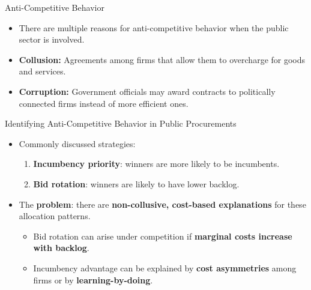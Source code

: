 \documentclass[12pt,english,xcolor=dvipsnames,aspectratio=1610]{beamer}
\begin{document}
\begin{frame}{Anti-Competitive Behavior}
  \begin{itemize}
    \item There are multiple reasons for anti-competitive behavior when the public sector is involved. \vspace{2mm}
    \item \textbf{Collusion:} Agreements among firms that allow them to overcharge for goods and services. \vspace{2mm}
    \item \textbf{Corruption:} Government officials may award contracts to politically connected firms instead of more efficient ones. \vspace{2mm}
  \end{itemize}
\end{frame}

\begin{frame}{Identifying Anti-Competitive Behavior in Public Procurements}
\begin{itemize}
  \item Commonly discussed strategies: \vspace{1mm}
  \begin{enumerate}
    \item \textbf{Incumbency priority}: winners are more likely to be incumbents.
    \item \textbf{Bid rotation}: winners are likely to have lower backlog.
  \end{enumerate} \pause
  \item The \textbf{problem}: there are \textbf{non-collusive, cost-based explanations} for these allocation patterns. \vspace{1mm}
  \begin{itemize}
    \item Bid rotation can arise under competition if \textbf{marginal costs increase with backlog}.
    \item Incumbency advantage can be explained by \textbf{cost asymmetries} among firms or by \textbf{learning-by-doing}.
  \end{itemize}
\end{itemize}
\end{frame}
\end{document}
